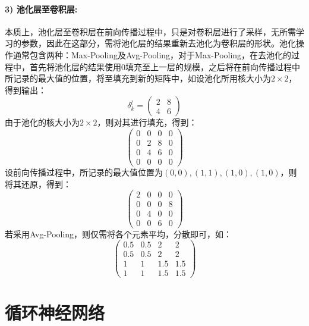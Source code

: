 \paragraph{3) 池化层至卷积层:}本质上，池化层至卷积层在前向传播过程中，只是对卷积层进行了采样，无所需学习的参数，因此在这部分，需将池化层的结果重新去池化为卷积层的形状。池化操作通常包含两种：Max-Pooling及Avg-Pooling，对于Max-Pooling，在去池化的过程中，首先将池化层的结果使用0填充至上一层的规模，之后将在前向传播过程中所记录的最大值的位置，将至填充到新的矩阵中，如设池化所用核大小为$2\times 2$，得到输出：
$$
\delta_{k}^{l}=\left(\begin{array}{ll}{2} & {8} \\ {4} & {6}\end{array}\right)
$$
由于池化的核大小为$2 \times 2$，则对其进行填充，得到：
$$
\left(\begin{array}{llll}{0} & {0} & {0} & {0} \\ {0} & {2} & {8} & {0} \\ {0} & {4} & {6} & {0} \\ {0} & {0} & {0} & {0}\end{array}\right)
$$
设前向传播过程中，所记录的最大值位置为$(0,0), (1, 1), (1, 0), (1, 0)$，则将其还原，得到：
$$
\left(\begin{array}{llll}{2} & {0} & {0} & {0} \\ {0} & {0} & {0} & {8} \\ {0} & {4} & {0} & {0} \\ {0} & {0} & {6} & {0}\end{array}\right)
$$
若采用Avg-Pooling，则仅需将各个元素平均，分散即可，如：
$$
  \left(\begin{array}{cccc}{0.5} & {0.5} & {2} & {2} \\ {0.5} & {0.5} & {2} & {2} \\ {1} & {1} & {1.5} & {1.5} \\ {1} & {1} & {1.5} & {1.5}\end{array}\right)
$$


\section{循环神经网络}